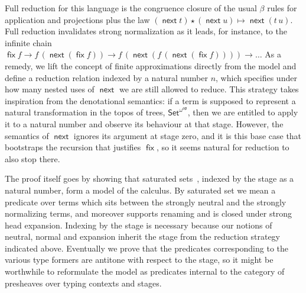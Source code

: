 \documentclass{book}
\DeclareMathOperator{\fix}{\mathsf{fix}}
\newcommand{\red}{\to}
\DeclareMathOperator{\next}{\ensuremath{\mathsf{next}}}
\begin{document}
  Full reduction for this language
  is the congruence closure of the usual $\beta$ rules
  for application and projections plus the law $(\next t)
  \star (\next u) \mapsto \next (t\,u)$.
  Full reduction invalidates strong normalization as it leads,
  for instance, to the infinite chain
  $\fix f \red f\,(\next (\fix f)) \red f\,(\next (f\,(\next (\fix f)))) \red
  \ldots$
%
  As a remedy, we lift the concept of finite approximations directly from
  the model and define a reduction relation indexed by a natural
  number $n$, which specifies under how many nested uses of $\next$ we
  are still allowed to reduce.
%
  This strategy takes inspiration from the denotational semantics: if
  a term is supposed to represent a natural transformation in the
  topos of trees, $\mathsf{Set}^{\omega^\mathsf{op}}$, then we are
  entitled to apply it to a natural number and observe its behaviour
  at that stage.  However, the semantics of $\next$ ignores its argument at
  stage zero, and it is this base case that bootstraps the recursion
  that justifies $\fix$, so it seems natural for reduction to also
  stop there.

  The proof itself goes by showing that saturated sets~\cite{barendregt:93},
  indexed by the stage as a natural number, form a model of the
  calculus. By saturated set we mean a predicate over terms which sits
  between the strongly neutral and the strongly normalizing terms, and
  moreover supports renaming and is closed under strong head
  expansion. Indexing by the stage is necessary because our notions
  of neutral, normal and expansion inherit the stage from the
  reduction strategy indicated above.
  Eventually we prove that the predicates corresponding to the various
  type formers are antitone with respect to the stage, so it might be
  worthwhile to reformulate the model as predicates internal to
  the category of presheaves over typing contexts and stages.
\end{document}
